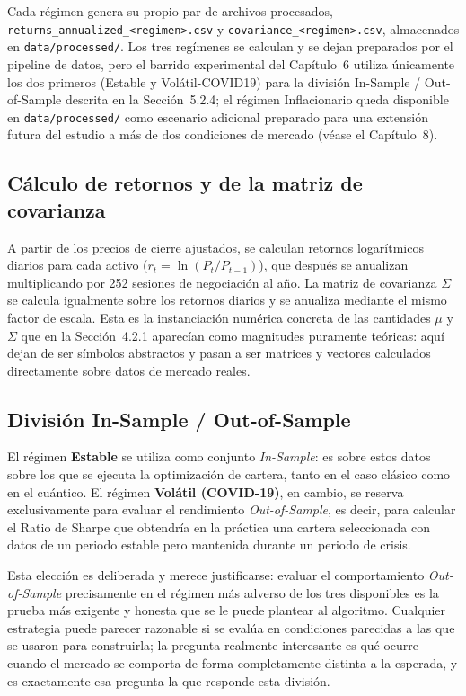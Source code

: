 Cada régimen genera su propio par de archivos procesados, \texttt{returns\_annualized\_<regimen>.csv} y \texttt{covariance\_<regimen>.csv}, almacenados en \texttt{data/processed/}. Los tres regímenes se calculan y se dejan preparados por el pipeline de datos, pero el barrido experimental del Capítulo~6 utiliza únicamente los dos primeros (Estable y Volátil-COVID19) para la división In-Sample / Out-of-Sample descrita en la Sección~5.2.4; el régimen Inflacionario queda disponible en \texttt{data/processed/} como escenario adicional preparado para una extensión futura del estudio a más de dos condiciones de mercado (véase el Capítulo~8).

\subsection{Cálculo de retornos y de la matriz de covarianza}

A partir de los precios de cierre ajustados, se calculan retornos logarítmicos diarios para cada activo ($r_t = \ln(P_t / P_{t-1})$), que después se anualizan multiplicando por 252 sesiones de negociación al año. La matriz de covarianza $\Sigma$ se calcula igualmente sobre los retornos diarios y se anualiza mediante el mismo factor de escala. Esta es la instanciación numérica concreta de las cantidades $\mu$ y $\Sigma$ que en la Sección~4.2.1 aparecían como magnitudes puramente teóricas: aquí dejan de ser símbolos abstractos y pasan a ser matrices y vectores calculados directamente sobre datos de mercado reales.

\subsection{División In-Sample / Out-of-Sample}
\label{sec:is-oos}

El régimen \textbf{Estable} se utiliza como conjunto \textit{In-Sample}: es sobre estos datos sobre los que se ejecuta la optimización de cartera, tanto en el caso clásico como en el cuántico. El régimen \textbf{Volátil (COVID-19)}, en cambio, se reserva exclusivamente para evaluar el rendimiento \textit{Out-of-Sample}, es decir, para calcular el Ratio de Sharpe que obtendría en la práctica una cartera seleccionada con datos de un periodo estable pero mantenida durante un periodo de crisis.

Esta elección es deliberada y merece justificarse: evaluar el comportamiento \textit{Out-of-Sample} precisamente en el régimen más adverso de los tres disponibles es la prueba más exigente y honesta que se le puede plantear al algoritmo. Cualquier estrategia puede parecer razonable si se evalúa en condiciones parecidas a las que se usaron para construirla; la pregunta realmente interesante es qué ocurre cuando el mercado se comporta de forma completamente distinta a la esperada, y es exactamente esa pregunta la que responde esta división.

